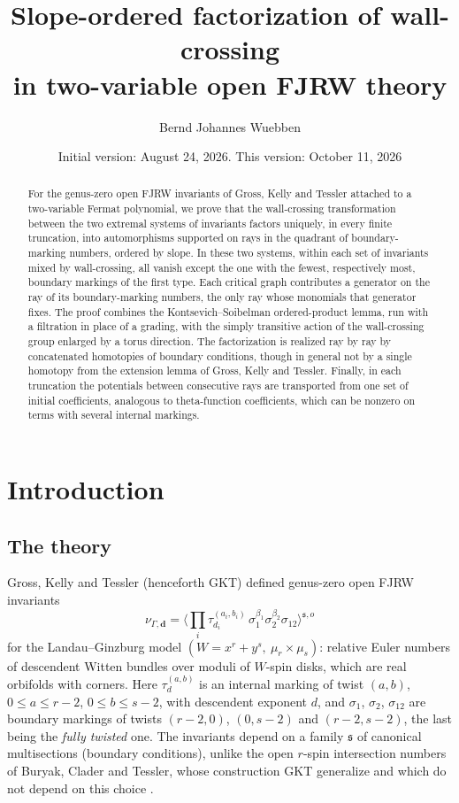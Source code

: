 \documentclass[11pt]{amsart}
\title[Slope-ordered factorization in open FJRW theory]{Slope-ordered
factorization of wall-crossing\\ in two-variable open FJRW theory}
\author{Bernd Johannes Wuebben}
\date{Initial version: August 24, 2026. This version: October 11, 2026}
\theoremstyle{definition}
\theoremstyle{remark}
\begin{document}
\begin{abstract}
For the genus-zero open FJRW invariants of Gross, Kelly and Tessler attached to
a two-variable Fermat polynomial, we prove that the wall-crossing
transformation between the two extremal systems of invariants factors
uniquely, in every finite truncation, into automorphisms supported on rays in
the quadrant of boundary-marking numbers, ordered by slope.  In these two
systems, within each set of invariants mixed by wall-crossing, all vanish
except the one with the fewest, respectively most, boundary markings of the
first type.
Each critical graph contributes a generator on the ray of its boundary-marking
numbers, the only ray whose monomials that generator fixes.  The proof
combines the Kontsevich--Soibelman ordered-product lemma, run with a
filtration in place of a grading, with the simply transitive action of the
wall-crossing group enlarged by a torus direction.  The factorization is realized ray by ray by
concatenated homotopies of boundary conditions, though in general not by a
single homotopy from the extension lemma of Gross, Kelly and Tessler.
Finally, in each truncation the potentials between consecutive rays are
transported from one set of initial coefficients, analogous to theta-function coefficients, which can
be nonzero on terms with several internal markings.
\end{abstract}

\maketitle
\enlargethispage{3pt}

\section{Introduction}
\label{sec:intro}

\subsection{The theory}
\label{ssec:theory}
Gross, Kelly and Tessler \cite{GKT} (henceforth GKT) defined genus-zero open
FJRW invariants
\[
\nu_{\Gamma,\mathbf d}
=\Big\langle\prod_{i}\tau_{d_{i}}^{(a_{i},b_{i})}\,
\sigma_{1}^{\beta_{1}}\sigma_{2}^{\beta_{2}}\sigma_{12}\Big\rangle^{\mathfrak s,o}
\]
for the Landau--Ginzburg model $(W=x^{r}+y^{s},\ \mu_{r}\times\mu_{s})$: relative
Euler numbers of descendent Witten bundles over moduli of $W$-spin disks, which are
real orbifolds with corners. Here $\tau_{d}^{(a,b)}$ is an internal marking of
twist $(a,b)$, $0\le a\le r-2$, $0\le b\le s-2$, with descendent exponent $d$, and
$\sigma_1$, $\sigma_2$, $\sigma_{12}$ are boundary markings of twists $(r{-}2,0)$,
$(0,s{-}2)$ and $(r{-}2,s{-}2)$, the last being the \emph{fully twisted} one.  The
invariants depend on a family $\mathfrak s$
of canonical multisections (boundary conditions), unlike the open $r$-spin
intersection numbers of Buryak, Clader and Tessler, whose construction GKT
generalize and which do not depend on this choice \cite[Thm.~3.17]{BCT21}.
\end{document}

